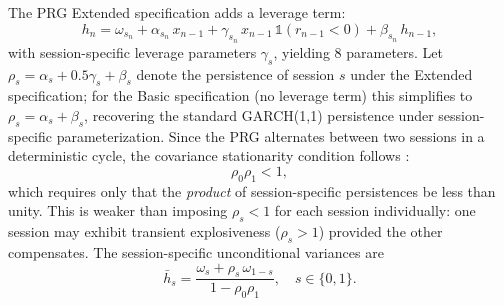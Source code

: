 \documentclass[11pt,a4paper]{article}
\begin{document}
The PRG Extended specification adds a leverage term:
\begin{equation}
    h_n = \omega_{s_n} + \alpha_{s_n} \, x_{n-1} + \gamma_{s_n} \, x_{n-1} \, \mathbb{1}(r_{n-1} < 0) + \beta_{s_n} \, h_{n-1},
    \label{eq:prg_extended}
\end{equation}
with session-specific leverage parameters $\gamma_s$, yielding 8 parameters. Let $\rho_s = \alpha_s + 0.5\gamma_s + \beta_s$ denote the persistence of session $s$ under the Extended specification; for the Basic specification (no leverage term) this simplifies to $\rho_s = \alpha_s + \beta_s$, recovering the standard GARCH(1,1) persistence under session-specific parameterization. Since the PRG alternates between two sessions in a deterministic cycle, the covariance stationarity condition follows \citet{Bollerslev1996}:
\begin{equation}
    \rho_0 \rho_1 < 1,
    \label{eq:stationarity}
\end{equation}
which requires only that the \emph{product} of session-specific persistences be less than unity. This is weaker than imposing $\rho_s < 1$ for each session individually: one session may exhibit transient explosiveness ($\rho_s > 1$) provided the other compensates. The session-specific unconditional variances are
\begin{equation}
    \bar{h}_s = \frac{\omega_s + \rho_s \, \omega_{1-s}}{1 - \rho_0 \rho_1}, \quad s \in \{0, 1\}.
    \label{eq:uncond_var}
\end{equation}
\end{document}
